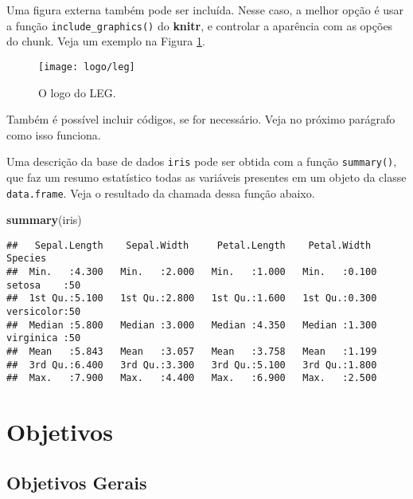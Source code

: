 \documentclass[
	12pt,				%
	openright,			%
	oneside,			%
	a4paper,			%
	brazil				%
	]{abntex2}
\newenvironment{Shaded}{\begin{snugshade}}{\end{snugshade}}
\newcommand{\FunctionTok}[1]{\textcolor[rgb]{0.13,0.29,0.53}{\textbf{#1}}}
\newcommand{\NormalTok}[1]{#1}
\begin{document}
Uma figura externa também pode ser incluída. Nesse caso, a melhor opção
é usar a função \texttt{include\_graphics()} do \textbf{knitr}, e controlar a
aparência com as opções do chunk. Veja um exemplo na Figura
\ref{fig:leg}.

\begin{figure}

{\centering \texttt{[image: logo/leg]} 

}

\caption{O logo do LEG.}\label{fig:leg}
\end{figure}

Também é possível incluir códigos, se for necessário. Veja no próximo
parágrafo como isso funciona.

Uma descrição da base de dados \texttt{iris} pode ser obtida com a função
\texttt{summary()}, que faz um resumo estatístico todas as variáveis presentes
em um objeto da classe \texttt{data.frame}. Veja o resultado da chamada dessa
função abaixo.

\begin{Shaded}
\begin{Highlighting}[]
\FunctionTok{summary}\NormalTok{(iris)}
\end{Highlighting}
\end{Shaded}

\begin{verbatim}
##   Sepal.Length    Sepal.Width     Petal.Length    Petal.Width          Species  
##  Min.   :4.300   Min.   :2.000   Min.   :1.000   Min.   :0.100   setosa    :50  
##  1st Qu.:5.100   1st Qu.:2.800   1st Qu.:1.600   1st Qu.:0.300   versicolor:50  
##  Median :5.800   Median :3.000   Median :4.350   Median :1.300   virginica :50  
##  Mean   :5.843   Mean   :3.057   Mean   :3.758   Mean   :1.199                  
##  3rd Qu.:6.400   3rd Qu.:3.300   3rd Qu.:5.100   3rd Qu.:1.800                  
##  Max.   :7.900   Max.   :4.400   Max.   :6.900   Max.   :2.500
\end{verbatim}

\chapter{Objetivos}\label{objetivos}

\bigskip

\section{Objetivos Gerais}\label{objetivos-gerais}
\end{document}
